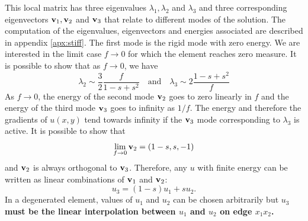 \documentclass{article}
\theoremstyle{remark}
\begin{document}
% 
This local matrix has three eigenvalues $\lambda_1, \lambda_2$ and $\lambda_3$ and three corresponding eigenvectors ${\bf v}_1, {\bf v}_2$ and ${\bf v}_3$ that relate to different modes of the solution. The computation of the eigenvalues, eigenvectors and energies associated are described in appendix \ref{apx:stiff}. The first mode is the rigid
 mode with zero energy.
We are interested in the limit case  
$f \rightarrow
0$ for which the element reaches zero measure. 
It is possible to show that as $f \rightarrow 0$, we have
\begin{equation}{\lambda_2 \sim \frac{3}{2} \frac{f}{1-s+s^2}
    \quad \text{and} \quad \lambda_3 \sim  2 \frac{ 1 - s + s^2}{f}} 
\label{eq:eig}
  \end{equation}
As $f
  \rightarrow 0$, the energy of the second mode ${\bf v}_2$ goes to zero linearly in
  $f$ and the energy of the third mode ${\bf v}_3$ goes to infinity as $1/f$.
The energy and therefore the gradients of $u(x,y)$ tend towards 
infinity if the ${\bf v}_3$ mode corresponding to $\lambda_3$ is active. 
It is possible to show that $$\lim_{f\rightarrow 0} {\bf v}_2 = (1-s, s, -1)$$ and ${\bf v}_2$ is always orthogonal to ${\bf v}_3$.
Therefore, any $u$ with finite energy can be written as
linear combinations of ${\bf v}_1$ and ${\bf v}_2$:
  \begin{equation}u_3 = (1-s) u_1 + s u_2.\label{eq:lin}\end{equation}
 In a degenerated element, values of ${u}_1$ and ${u}_2$ can be chosen arbitrarily but $u_3$ {\bf must be the linear 
interpolation between $u_1$ and $u_2$ on edge ${ x}_1 {x}_2$.}
\end{document}
